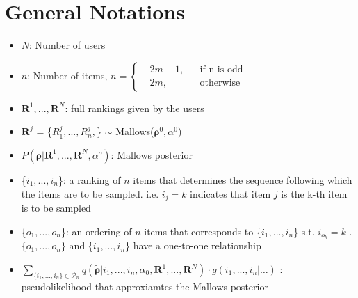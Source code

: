 \documentclass[11pt, oneside]{article}   	%
\title{}
\author{}
\date{}							%
\begin{document}
\maketitle
\section{General Notations}

\begin{itemize}

	\item {$N$: Number of users}
	
	\item {$n$: Number of items,    $
	n = \left \{
	\begin{aligned}
	&2m-1, && \text{if n is odd} \\
	&2m, && \text{otherwise}
	\end{aligned} \right.
	$}
	
	\item {$\bm{R}^1,...,\bm{R}^N$: full rankings given by the users}
	
	
	\item {$\bm{R}^j$ = \{$R^j_1,...,R^j_n,$\} $\sim$ Mallows($\bm{\rho}^0, \alpha^0$)}
	
	
	\item {$P(\bm{\rho}|\bm{R}^1,...,\bm{R}^N,\alpha^o)$: Mallows posterior}
	
	
	\item{\{$i_1, ..., i_n$\}: a ranking of $n$ items that determines the sequence following which the items are to be sampled. i.e. $i_j = k$ indicates that item $j$ is the k-th item is to be sampled}
	
	\item{ \{$o_1, ..., o_n$\}: an ordering of $n$ items that corresponds to \{$i_1, ..., i_n$\} s.t. $i_{o_k} = k$ }. $\{o_1, ...,o_n\}$ and \{$i_1, ..., i_n$\} have a one-to-one relationship
	
	\item {$\sum\limits_{\{i_1, ..., i_n \}\in \mathcal{P}_n }q(\tilde{\bm{\rho}}|i_1, ..., i_n, \alpha_0, \bm{R}^1, ...,\bm{R}^N) \cdot g(i_1, ..., i_n| \dots)$ : pseudolikelihood that approxiamtes the Mallows posterior}
	

\end{itemize}
\end{document}
